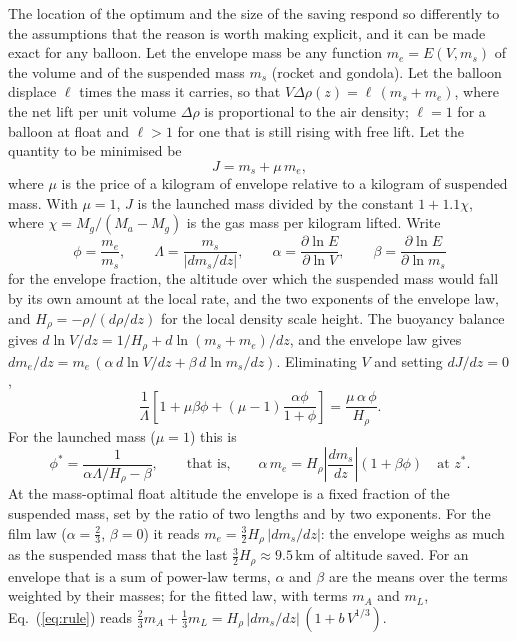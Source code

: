 \documentclass[11pt,a4paper]{article}
\begin{document}
The location of the optimum and the size of the saving respond so differently to the assumptions that the reason is worth making explicit, and it can be made exact for any balloon. Let the envelope mass be any function $m_e=E(V,m_s)$ of the volume and of the suspended mass $m_s$ (rocket and gondola). Let the balloon displace $\ell$ times the mass it carries, so that $V\Delta\rho(z)=\ell\,(m_s+m_e)$, where the net lift per unit volume $\Delta\rho$ is proportional to the air density; $\ell=1$ for a balloon at float and $\ell>1$ for one that is still rising with free lift. Let the quantity to be minimised be
\begin{equation}
J=m_s+\mu\,m_e ,
\label{eq:objective}
\end{equation}
where $\mu$ is the price of a kilogram of envelope relative to a kilogram of suspended mass. With $\mu=1$, $J$ is the launched mass divided by the constant $1+1.1\chi$, where $\chi=M_g/(M_a-M_g)$ is the gas mass per kilogram lifted. Write
\begin{equation}
\phi=\frac{m_e}{m_s},\qquad \Lambda=\frac{m_s}{|dm_s/dz|},\qquad \alpha=\frac{\partial\ln E}{\partial\ln V},\qquad \beta=\frac{\partial\ln E}{\partial\ln m_s}
\end{equation}
for the envelope fraction, the altitude over which the suspended mass would fall by its own amount at the local rate, and the two exponents of the envelope law, and $H_\rho=-\rho/(d\rho/dz)$ for the local density scale height. The buoyancy balance gives $d\ln V/dz=1/H_\rho+d\ln(m_s+m_e)/dz$, and the envelope law gives $dm_e/dz=m_e\,(\alpha\,d\ln V/dz+\beta\,d\ln m_s/dz)$. Eliminating $V$ and setting $dJ/dz=0$,
\begin{equation}
\frac{1}{\Lambda}\left[1+\mu\beta\phi+(\mu-1)\frac{\alpha\phi}{1+\phi}\right]=\frac{\mu\,\alpha\,\phi}{H_\rho}.
\label{eq:general}
\end{equation}
For the launched mass ($\mu=1$) this is
\begin{equation}
\phi^{*}=\frac{1}{\alpha\Lambda/H_\rho-\beta},\qquad\text{that is,}\qquad \alpha\,m_e=H_\rho\left|\frac{dm_s}{dz}\right|(1+\beta\phi)\quad\text{at }z^{*}.
\label{eq:rule}
\end{equation}
At the mass-optimal float altitude the envelope is a fixed fraction of the suspended mass, set by the ratio of two lengths and by two exponents. For the film law ($\alpha=\tfrac23$, $\beta=0$) it reads $m_e=\tfrac32H_\rho\,|dm_s/dz|$: the envelope weighs as much as the suspended mass that the last $\tfrac32H_\rho\approx9.5$\,km of altitude saved. For an envelope that is a sum of power-law terms, $\alpha$ and $\beta$ are the means over the terms weighted by their masses; for the fitted law, with terms $m_A$ and $m_L$, Eq.~(\ref{eq:rule}) reads $\tfrac23m_A+\tfrac13m_L=H_\rho\,|dm_s/dz|\,(1+b\,V^{1/3})$.
\end{document}
